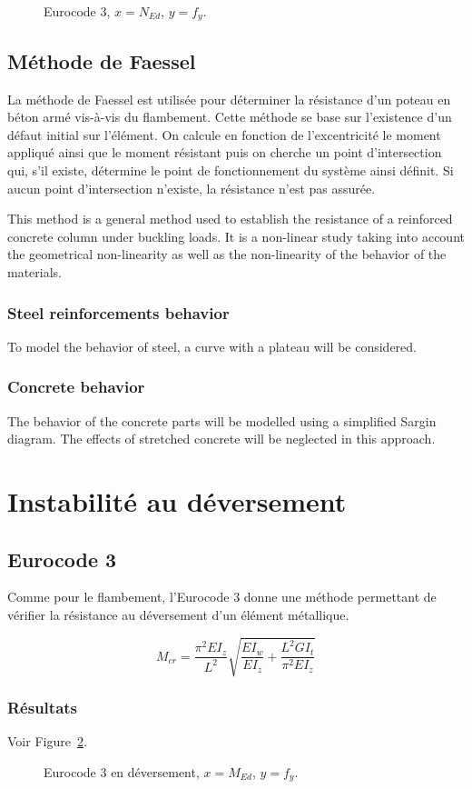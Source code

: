 \documentclass{report}
\begin{document}
\begin{figure}[!ht]
    \centering
    
    \caption{Eurocode 3, $x=N_{Ed}$, $y=f_y$.}\label{fig:res2}
\end{figure}

\subsection{Méthode de Faessel}

La méthode de Faessel est utilisée pour déterminer la résistance d'un poteau en béton armé vis-à-vis du flambement. Cette méthode se base sur l'existence d'un défaut initial sur l'élément. On calcule en fonction de l'excentricité le moment appliqué ainsi que le moment résistant puis on cherche un point d'intersection qui, s'il existe, détermine le point de fonctionnement du système ainsi définit. Si aucun point d'intersection n'existe, la résistance n'est pas assurée.

This method is a general method used to establish the resistance of a reinforced concrete column under buckling loads.
It is a non-linear study  taking into account the geometrical non-linearity as well as the non-linearity of the behavior of the materials.

\subsubsection{Steel reinforcements behavior}
To model the behavior of steel, a curve with a plateau will be considered.

\subsubsection{Concrete behavior}
The behavior of the concrete parts will be modelled using a simplified Sargin diagram.
The effects of stretched concrete will be neglected in this approach.

\section{Instabilité au déversement}
\subsection{Eurocode 3}
Comme pour le flambement, l'Eurocode 3 donne une méthode permettant de vérifier la résistance au déversement d'un élément métallique.

\begin{dmath}
    M_{cr}=\frac{\pi^2 EI_z}{L^2}\sqrt{\frac{EI_w}{EI_z}+\frac{L^2GI_t}{\pi^2EI_z}}
\end{dmath}

\subsubsection{Résultats}
Voir Figure~\ref{fig:m1}.

\begin{figure}[!ht]
    \centering
    
    \caption{Eurocode 3 en déversement, $x=M_{Ed}$, $y=f_y$.}\label{fig:m1}
\end{figure}

\listoffigures

\nocite{*}
\printbibliography
\end{document}
